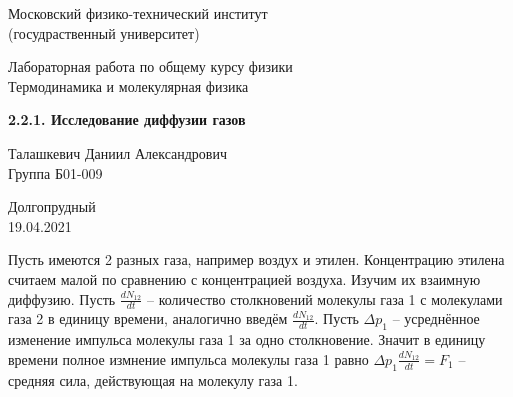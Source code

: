 \documentclass[a4paper, 12pt]{article} %
\begin{document}


\begin{titlepage}

	\newpage
	\begin{center}
		\normalsize Московский физико-технический институт \\(госудраственный университет)
	\end{center}

	\vspace{6em}

	\begin{center}
		\Large Лабораторная работа по общему курсу физики\\Термодинамика и молекулярная физика
	\end{center}

	\vspace{1em}

	\begin{center}
		\Large \textbf{2.2.1. Исследование диффузии газов}
	\end{center}

	\vspace{2em}

	\begin{center}
		\large Талашкевич Даниил Александрович\\
		Группа Б01-009
	\end{center}

	\vspace{\fill}

	\begin{center}
		Долгопрудный \\19.04.2021
	\end{center}
	
\end{titlepage}



Пусть имеются 2 разных газа, например воздух и этилен. Концентрацию этилена считаем малой по сравнению с концентрацией воздуха. Изучим их взаимную диффузию. Пусть $\frac{dN_{12}}{dt}$ -- количество столкновений молекулы газа 1 с молекулами газа 2  в единицу времени, аналогично введём $\frac{dN_{12}}{dt}$. Пусть $\Delta p_1$ -- усреднённое изменение импульса молекулы газа 1 за одно столкновение. Значит в единицу времени полное измнение импульса молекулы газа 1 равно $\Delta p_1 \frac{dN_{12}}{dt} = F_1$ -- средняя сила, действующая на молекулу  газа 1.  
\end{document}
